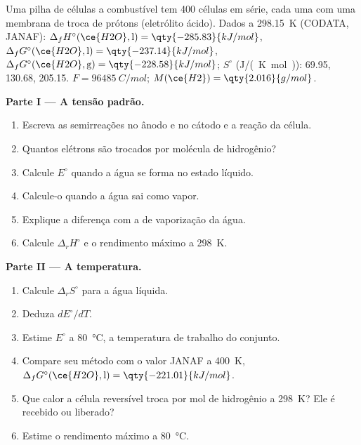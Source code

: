 \begin{problem}
\label{pb:b2:cell-thermodynamics:1}
Uma pilha de células a combustível tem 400 células em série, cada uma com uma
membrana de troca de prótons (eletrólito ácido). Dados a \qty{298.15}{K} (CODATA, JANAF):
$\Delta_f H^\circ(\ce{H2O}, \text{l}) = \qty{-285.83}{kJ/mol}$, $\Delta_f
G^\circ(\ce{H2O}, \text{l}) = \qty{-237.14}{kJ/mol}$, $\Delta_f G^\circ(\ce{H2O},
\text{g}) = \qty{-228.58}{kJ/mol}$; $S^\circ$ (\unit{J/(K.mol)}):  69.95,
 130.68,  205.15. $F = \qty{96485}{C/mol}$; $M(\ce{H2}) =
\qty{2.016}{g/mol}$.

\medskip
\noindent\textbf{Parte I --- A tensão padrão.}
\begin{enumerate}
  \item Escreva as semirreações no ânodo e no cátodo e a reação da
        célula.
  \item Quantos elétrons são trocados por molécula de hidrogênio?
  \item Calcule $E^\circ$ quando a água se forma no estado líquido.
  \item Calcule-o quando a água sai como vapor.
  \item Explique a diferença com a  de vaporização da água.
  \item Calcule $\Delta_r H^\circ$ e o rendimento máximo a \qty{298}{K}.
\end{enumerate}

\medskip
\noindent\textbf{Parte II --- A temperatura.}
\begin{enumerate}[resume]
  \item Calcule $\Delta_r S^\circ$ para a água líquida.
  \item Deduza $dE^\circ/dT$.
  \item Estime $E^\circ$ a \qty{80}{\degreeCelsius}, a temperatura de trabalho do
        conjunto.
  \item Compare seu método com o valor JANAF a \qty{400}{K}, $\Delta_f
        G^\circ(\ce{H2O}, \text{l}) = \qty{-221.01}{kJ/mol}$.
  \item Que calor a célula reversível troca por mol de hidrogênio a
        \qty{298}{K}? Ele é recebido ou liberado?
  \item Estime o rendimento máximo a \qty{80}{\degreeCelsius}.
\end{enumerate}


\end{problem}
